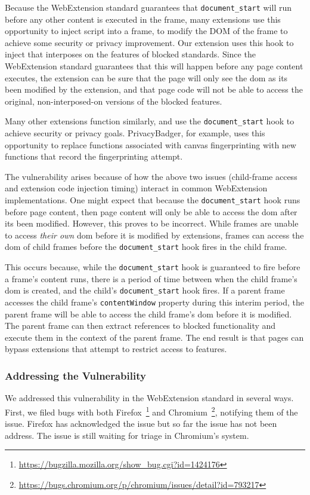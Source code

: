 Because the WebExtension standard guarantees that \texttt{document\_start} will
run before any other content is executed in the frame, many extensions use
this opportunity to inject script into a frame, to modify the DOM of the frame
to achieve some security or privacy improvement.  Our extension uses this
hook to inject \JS that interposes on the features of blocked standards.
Since the WebExtension standard guarantees that this will happen
before any page content executes, the extension can be sure that the page will
only see the \gls{dom} as its been modified by the extension, and that page code
will not be able to access the original, non-interposed-on versions of the
blocked features.

Many other extensions function similarly, and use the
\texttt{document\_start} hook to achieve security or privacy goals.
PrivacyBadger, for example, uses this opportunity to replace \WAPI functions
associated with canvas fingerprinting with new functions that record the
fingerprinting attempt.


The vulnerability arises because of how the above two issues (child-frame
access and extension code injection timing) interact in common WebExtension
implementations.  One might expect that because the \texttt{document\_start}
hook runs before page content, then page content will only be able to access
the \gls{dom} after its been modified.  However, this proves to be incorrect.
While frames are unable to access \emph{their own} \gls{dom} before it is
modified by extensions, frames can access the \gls{dom} of child frames before
the \texttt{document\_start} hook fires in the child frame.

This occurs because, while the \texttt{document\_start} hook is guaranteed to
fire before a frame's content runs, there is a period of time between when the
child frame's \gls{dom} is created, and the child's \texttt{document\_start}
hook fires.  If a parent frame accesses the child frame's
\texttt{contentWindow} property during this interim period, the parent frame
will be able to access the child frame's \gls{dom} before it is modified.  The
parent frame can then extract references to blocked functionality and execute
them in the context of the parent frame.  The end result is that pages can
bypass extensions that attempt to restrict access to \WAPI features.


\subsubsection{Addressing the Vulnerability}
We addressed this vulnerability in the WebExtension standard in
several ways.  First, we filed bugs with both
Firefox~\footnote{\url{https://bugzilla.mozilla.org/show_bug.cgi?id=1424176}}
and Chromium~\footnote{\url{https://bugs.chromium.org/p/chromium/issues/detail?id=793217}},
notifying them of the issue.  Firefox has acknowledged the issue but so far the
issue has not been address.  The issue is still waiting for triage in
Chromium's system.

